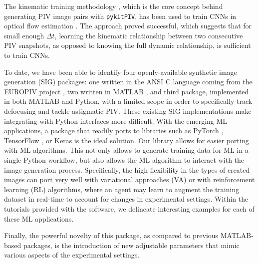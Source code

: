 \documentclass[a4paper,fleqn]{cas-dc}
\newcommand{ \kamila}[1]{\color{blue}{Kamila: #1} \color{black}}
\begin{document}
The kinematic training methodology \cite{manickathan2022kinematic}, which is the core concept behind generating PIV image pairs with \texttt{pykitPIV}, has been used to train CNNs in optical flow estimation \cite{manickathan2022kinematic, manickathan2023lightweight, mucignat2023lightweight}. The approach proved successful, which suggests that for small enough $\Delta t$, learning the kinematic relationship between two consecutive PIV snapshots, as opposed to knowing the full dynamic relationship, is sufficient to train CNNs.


\cite{mucignat2024respiratory}


To date, we have been able to identify four openly-available synthetic image generation (SIG) packages: one written in the ANSI C language coming from the EUROPIV project \cite{lecordier2004europiv}, two written in MATLAB \citep{ben2020openpiv, mendes2020piv}, and third package, implemented in both MATLAB and Python, with a limited scope in order to specifically track defocusing and tackle astigmatic PIV. These existing SIG implementations make integrating with Python interfaces more difficult. With the emerging ML applications, a package that readily ports to libraries such as PyTorch \cite{paszke2017automatic, paszke2019pytorch}, TensorFlow \cite{tensorflow2015}, or Keras \cite{chollet2015keras} is the ideal solution. Our library allows for easier porting with ML algorithms. This not only allows to generate training data for ML in a single Python workflow, but also allows the ML algorithm to interact with the image generation process. Specifically, the high flexibility in the types of created images can port very well with variational approaches (VA) or with reinforcement learning (RL) algorithms, where an agent may learn to augment the training dataset in real-time to account for changes in experimental settings. Within the tutorials provided with the software, we delineate interesting examples for each of these ML applications.

Finally, the powerful novelty of this package, as compared to previous MATLAB-based packages, is the introduction of new adjustable parameters that mimic various aspects of the experimental settings. 


\end{document}
